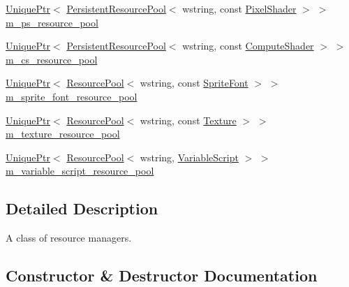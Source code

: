 \begin{DoxyCompactItemize}
\item 
\hyperlink{namespacemage_a3316d7143a973e37adf1110f2e80ca31}{Unique\+Ptr}$<$ \hyperlink{classmage_1_1_persistent_resource_pool}{Persistent\+Resource\+Pool}$<$ wstring, const \hyperlink{namespacemage_a27ecaf266420ee7a494d64edc0757129}{Pixel\+Shader} $>$ $>$ \hyperlink{classmage_1_1_resource_manager_ab271d7c35552e28b3b79cb10fea5cf72}{m\+\_\+ps\+\_\+resource\+\_\+pool}
\item 
\hyperlink{namespacemage_a3316d7143a973e37adf1110f2e80ca31}{Unique\+Ptr}$<$ \hyperlink{classmage_1_1_persistent_resource_pool}{Persistent\+Resource\+Pool}$<$ wstring, const \hyperlink{namespacemage_ae040329401484b076f0cd1a7c43d19c9}{Compute\+Shader} $>$ $>$ \hyperlink{classmage_1_1_resource_manager_a5c363073fa94f73193faaa1f65365299}{m\+\_\+cs\+\_\+resource\+\_\+pool}
\item 
\hyperlink{namespacemage_a3316d7143a973e37adf1110f2e80ca31}{Unique\+Ptr}$<$ \hyperlink{classmage_1_1_resource_pool}{Resource\+Pool}$<$ wstring, const \hyperlink{classmage_1_1_sprite_font}{Sprite\+Font} $>$ $>$ \hyperlink{classmage_1_1_resource_manager_a4447daa4489cfe3d06629799f829915f}{m\+\_\+sprite\+\_\+font\+\_\+resource\+\_\+pool}
\item 
\hyperlink{namespacemage_a3316d7143a973e37adf1110f2e80ca31}{Unique\+Ptr}$<$ \hyperlink{classmage_1_1_resource_pool}{Resource\+Pool}$<$ wstring, const \hyperlink{classmage_1_1_texture}{Texture} $>$ $>$ \hyperlink{classmage_1_1_resource_manager_a267774ad90f546e73a9415e6baa37d2a}{m\+\_\+texture\+\_\+resource\+\_\+pool}
\item 
\hyperlink{namespacemage_a3316d7143a973e37adf1110f2e80ca31}{Unique\+Ptr}$<$ \hyperlink{classmage_1_1_resource_pool}{Resource\+Pool}$<$ wstring, \hyperlink{classmage_1_1_variable_script}{Variable\+Script} $>$ $>$ \hyperlink{classmage_1_1_resource_manager_adc36ebb3e2d04fddc3a23e2f1303dbfe}{m\+\_\+variable\+\_\+script\+\_\+resource\+\_\+pool}
\end{DoxyCompactItemize}


\subsection{Detailed Description}
A class of resource managers. 

\subsection{Constructor \& Destructor Documentation}
\hypertarget{classmage_1_1_resource_manager_a0ff509899a9fbef2096c60b3d3d80bd5}{}\label{classmage_1_1_resource_manager_a0ff509899a9fbef2096c60b3d3d80bd5} 
